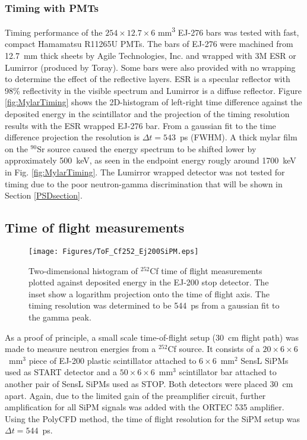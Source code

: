 \subsubsection{Timing with PMTs}
Timing performance of the $254\times12.7\times6$ mm\textsuperscript{3} EJ-276 bars was tested with fast, compact Hamamatsu R11265U PMTs. The bars of EJ-276 were machined from 12.7~mm thick sheets by Agile Technologies, Inc. and wrapped with 3M\textsuperscript{\texttrademark} ESR or Lumirror\textsuperscript{\texttrademark} (produced by Toray). Some bars were also provided with no wrapping to determine the effect of the reflective layers. ESR is a specular reflector with 98\% reflectivity in the visible spectrum and Lumirror\textsuperscript{\texttrademark} is a diffuse reflector. Figure \ref{fig:MylarTiming} shows the 2D-histogram of left-right time difference against the deposited energy in the scintillator and the projection of the timing resolution results with the ESR wrapped EJ-276 bar. From a gaussian fit to the time difference projection the resolution is $\Delta t=543$~ps (FWHM). A thick mylar film on the $^{90}$Sr source caused the energy spectrum to be shifted lower by approximately 500~keV, as seen in the endpoint energy rougly around 1700~keV in Fig. \ref{fig:MylarTiming}.  The Lumirror\textsuperscript{\texttrademark} wrapped detector was not tested for timing due to the poor neutron-gamma discrimination that will be shown in Section \ref{PSDsection}.

\subsection{Time of flight measurements}

\begin{figure}[hbt]
  \texttt{[image: Figures/ToF\_Cf252\_Ej200SiPM.eps]}
  \caption{Two-dimensional histogram of $^{252}$Cf time of flight measurements plotted against deposited energy in the EJ-200 stop detector. The inset show a logarithm projection onto the time of flight axis. The timing resolution was determined to be 544~ps from a gaussian fit to the gamma peak.}
  \label{fig:ToF_SiPM}
\end{figure}

As a proof of principle, a small scale time-of-flight setup (30~cm flight path) was made to measure neutron energies from a $^{252}$Cf source. It consists of a $20\times6\times6$~mm$^3$  piece of EJ-200 plastic scintillator attached to $6\times6$~mm$^2$ SensL\textsuperscript{\textregistered} SiPMs used as START detector and a  $50\times6\times6$~mm$^3$ scintillator bar attached to another pair of SensL\textsuperscript{\textregistered} SiPMs used as STOP. Both detectors were placed 30~cm apart. Again, due to the limited gain of the preamplifier circuit, further amplification for all SiPM signals was added with the ORTEC\textsuperscript{\textregistered} 535 amplifier. Using the PolyCFD method, the time of flight resolution for the SiPM setup was $\Delta t=544$~ps.


